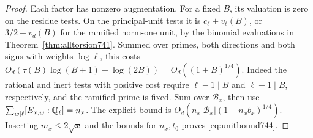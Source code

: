\documentclass[a4paper,11pt]{article}
\theoremstyle{definition}
\theoremstyle{remark}
\numberwithin{equation}{section}
\begin{document}
\begin{proof}
Each factor has nonzero augmentation. For a fixed \(B\), its
valuation is zero on the residue tests. On the principal-unit
tests it is \(c_\ell+v_\ell(B)\), or \(3/2+v_d(B)\) for the
ramified norm-one unit, by the binomial evaluations in
Theorem~\ref{thm:alltorsion741}. Summed over primes, both
directions and both signs with weights \(\log\ell\), this costs
\(O_d(\tau(B)\log(B+1)+\log(2B))=O_d((1+B)^{1/4})\).
Indeed the rational and inert tests with positive cost require
\(\ell-1\mid B\) and \(\ell+1\mid B\), respectively, and the
ramified prime is fixed. Sum over \(\mathcal B_x\), then use
\(\sum_{w\mid\ell}[E_{x,w}:\mathbb Q_\ell]=n_x\). The explicit bound
is \(O_d(n_x|\mathcal B_x|(1+n_xb_x)^{1/4})\). Inserting
\(m_x\le2\sqrt{x}\) and the bounds for \(n_x,t_0\) proves
\eqref{eq:unitbound744}.
\end{proof}
\end{document}

